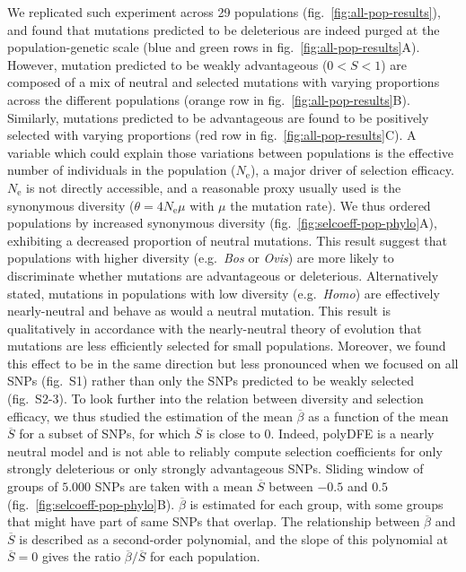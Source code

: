 \documentclass{article}
\newcommand{\Ne}{N_{\mathrm{e}}}
\newcommand{\Sphy}{S}
\newcommand{\SphyMean}{\overline{\Sphy}}
\newcommand{\divWeakAdv}{0 < \Sphy < 1}
\newcommand{\Spop}{\beta}
\newcommand{\SpopMean}{\overline{\Spop}}
\begin{document}
    We replicated such experiment across 29 populations (fig.~\ref{fig:all-pop-results}), and found that mutations predicted to be deleterious are indeed purged at the population-genetic scale (blue and green rows in fig.~\ref{fig:all-pop-results}A).
    However, mutation predicted to be weakly advantageous ($\divWeakAdv$) are composed of a mix of neutral and selected mutations with varying proportions across the different populations (orange row in fig.~\ref{fig:all-pop-results}B).
    Similarly, mutations predicted to be advantageous are found to be positively selected with varying proportions (red row in fig.~\ref{fig:all-pop-results}C).
    A variable which could explain those variations between populations is the effective number of individuals in the population ($\Ne$), a major driver of selection efficacy.
    $\Ne$ is not directly accessible, and a reasonable proxy usually used is the synonymous diversity ($\theta=4\Ne\mu$ with $\mu$ the mutation rate).
    We thus ordered populations by increased synonymous diversity (fig.~\ref{fig:selcoeff-pop-phylo}A), exhibiting a decreased proportion of neutral mutations.
    This result suggest that populations with higher diversity (e.g.~\textit{Bos} or \textit{Ovis}) are more likely to discriminate whether mutations are advantageous or deleterious.
    Alternatively stated, mutations in populations with low diversity (e.g.~\textit{Homo}) are effectively nearly-neutral and behave as would a neutral mutation.
    This result is qualitatively in accordance with the nearly-neutral theory of evolution that mutations are less efficiently selected for small populations.
    Moreover, we found this effect to be in the same direction but less pronounced when we focused on all SNPs (fig.~S1) rather than only the SNPs predicted to be weakly selected (fig.~S2-3).
    To look further into the relation between diversity and selection efficacy, we thus studied the estimation of the mean $\SpopMean$ as a function of the mean $\SphyMean$ for a subset of SNPs, for which $\SphyMean$ is close to $0$.
    Indeed, polyDFE is a nearly neutral model and is not able to reliably compute selection coefficients for only strongly deleterious or only strongly advantageous SNPs.
    Sliding window of groups of $5.000$ SNPs are taken with a mean $\SphyMean$ between $-0.5$ and $0.5$ (fig.~\ref{fig:selcoeff-pop-phylo}B).
    $\SpopMean$ is estimated for each group, with some groups that might have part of same SNPs that overlap.
    The relationship between $\SpopMean$ and $\SphyMean$ is described as a second-order polynomial, and the slope of this polynomial at $\SphyMean=0$ gives the ratio $\SpopMean/\SphyMean$ for each population.
\end{document}
